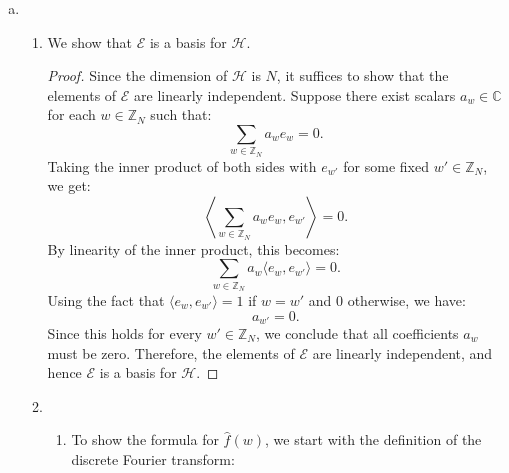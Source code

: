 \documentclass{article}
\def\zz{{\mathbb Z}}
\def\cc{{\mathbb C}}
\begin{document}
\begin{enumerate}[(a)]
\begin{proof}
        \begin{equation*}
            S(T(v)) = a_1 v_1 + a_2 v_2 + \ldots + a_n v_n = v.
        \end{equation*}
        This shows that $S \circ T = I_V$. \\
        Since inverses are unique, we conclude that $T$ is invertible.
    \end{proof}
    \item  
    \begin{enumerate}[1.]
        \item We show that $\mathscr{E}$ is a basis for $\mathscr{H}$. 
        \begin{proof}
            Since the dimension of $\mathscr{H}$ is $N$, it suffices to show that the elements of $\mathscr{E}$ are linearly independent. Suppose there exist scalars $a_w \in \cc$ for each $w \in \zz_N$ such that:
            \begin{equation*}
                \sum_{w \in \zz_N} a_w e_w = 0.
            \end{equation*}
            Taking the inner product of both sides with $e_{w'}$ for some fixed $w' \in \zz_N$, we get:
            \begin{equation*}
                \left\langle \sum_{w \in \zz_N} a_w e_w, e_{w'} \right\rangle = 0.
            \end{equation*}
            By linearity of the inner product, this becomes:
            \begin{equation*}
                \sum_{w \in \zz_N} a_w \langle e_w, e_{w'} \rangle = 0.
            \end{equation*}
            Using the fact that $\langle e_w, e_{w'} \rangle = 1$ if $w = w'$ and $0$ otherwise, we have:
            \begin{equation*}
                a_{w'} = 0.
            \end{equation*}
            Since this holds for every $w' \in \zz_N$, we conclude that all coefficients $a_w$ must be zero. Therefore, the elements of $\mathscr{E}$ are linearly independent, and hence $\mathscr{E}$ is a basis for $\mathscr{H}$.
        \end{proof}
        \item 
        \begin{enumerate}[1.]
            \item To show the formula for $\hat{f}(w)$, we start with the definition of the discrete Fourier transform:
            \begin{equation*}

\end{equation*}
\end{enumerate}
\end{enumerate}
\end{enumerate}
\end{document}
